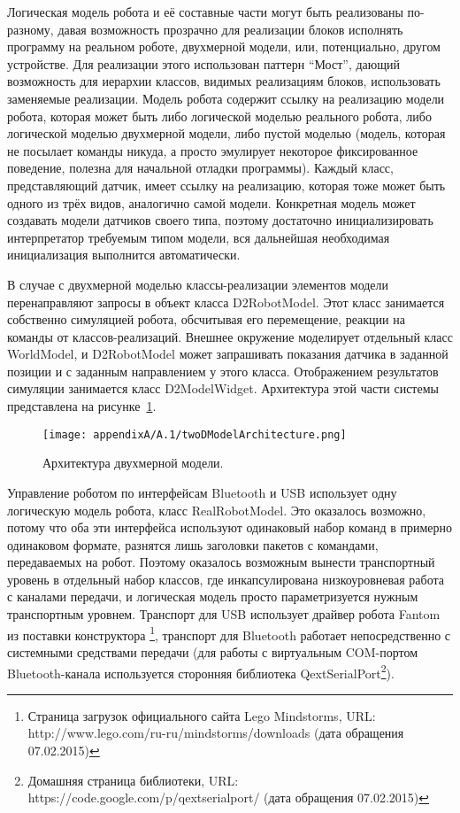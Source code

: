 Логическая модель робота и её составные части могут быть реализованы по-разному, давая 
возможность прозрачно для реализации блоков исполнять программу на реальном роботе, 
двухмерной модели, или, потенциально, другом устройстве. Для реализации этого использован 
паттерн "`Мост"', дающий возможность для иерархии классов, видимых реализациям блоков, 
использовать заменяемые реализации. Модель робота содержит ссылку на реализацию модели 
робота, которая может быть либо логической моделью реального робота, либо логической 
моделью двухмерной модели, либо пустой моделью (модель, которая не посылает команды 
никуда, а просто эмулирует некоторое фиксированное поведение, полезна для начальной 
отладки программы). Каждый класс, представляющий датчик, имеет ссылку на реализацию, 
которая тоже может быть одного из трёх видов, аналогично самой модели. Конкретная 
модель может создавать модели датчиков своего типа, поэтому достаточно инициализировать 
интерпретатор требуемым типом модели, вся дальнейшая необходимая инициализация выполнится 
автоматически.

В случае с двухмерной моделью классы-реализации элементов модели перенаправляют запросы 
в объект класса D2RobotModel. Этот класс занимается собственно симуляцией робота, 
обсчитывая его перемещение, реакции на команды от классов-реализаций. Внешнее окружение 
моделирует отдельный класс WorldModel, и D2RobotModel может запрашивать показания 
датчика в заданной позиции и с заданным направлением у этого класса. Отображением 
результатов симуляции занимается класс D2ModelWidget. Архитектура этой части системы 
представлена на рисунке~\ref{image:twoDModelArchitecture}.

\begin{figure} [ht]
	\begin{center}
		\texttt{[image: appendixA/A.1/twoDModelArchitecture.png]}
		\caption{Архитектура двухмерной модели.}
		\label{image:twoDModelArchitecture}
	\end{center}
\end{figure}

Управление роботом по интерфейсам Bluetooth и USB использует одну логическую модель 
робота, класс RealRobotModel. Это оказалось возможно, потому что оба эти интерфейса 
используют одинаковый набор команд в примерно одинаковом формате, разнятся лишь заголовки 
пакетов с командами, передаваемых на робот. Поэтому оказалось возможным вынести транспортный 
уровень в отдельный набор классов, где инкапсулирована низкоуровневая работа с каналами 
передачи, и логическая модель просто параметризуется нужным транспортным уровнем. 
Транспорт для USB использует драйвер робота Fantom из поставки конструктора%
\footnote{Страница загрузок официального сайта Lego Mindstorms, URL: http://www.lego.com/ru-ru/mindstorms/downloads (дата обращения 07.02.2015)}, 
транспорт для Bluetooth работает непосредственно с системными средствами передачи 
(для работы с виртуальным COM-портом Bluetooth-канала используется сторонняя библиотека 
QextSerialPort\footnote{Домашняя страница библиотеки, URL: https://code.google.com/p/qextserialport/ (дата обращения 07.02.2015)}).

